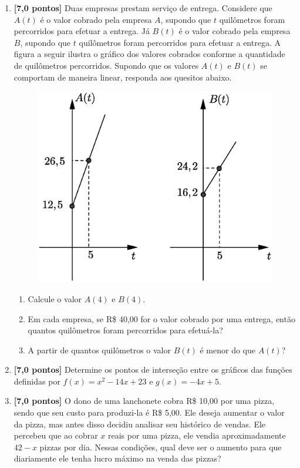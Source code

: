 \documentclass[12pt,a4paper]{article}
\begin{document}
\begin{enumerate}
  \item \textbf{[7,0 pontos]} Duas empresas prestam serviço de entrega. Considere que $A(t)$ é o valor
    cobrado pela empresa $A$, supondo que $t$ quilômetros foram percorridos para
    efetuar a entrega. Já $B(t)$ é o valor cobrado pela empresa $B$, supondo que
    $t$ quilômetros foram percorridos para efetuar a entrega. A figura a seguir
    ilustra o gráfico dos valores cobrados conforme a quantidade de quilômetros
    percorridos. Supondo que os valores $A(t)$ e $B(t)$ se comportam de maneira
    linear, responda aos quesitos abaixo.
  
  \begin{figure}[H]
    \centering
    \includegraphics[scale=0.5]{figura/grafico-duas-empresas.eps}
  \end{figure}
  
  \begin{enumerate}
    \item Calcule o valor $A(4)$ e $B(4)$.
    \item Em cada empresa, se R\$ 40,00 for o valor cobrado por uma entrega, então quantos quilômetros foram percorridos para efetuá-la?
    \item A partir de quantos quilômetros o valor $B(t)$ é menor do que $A(t)$?
  \end{enumerate}

  \item \textbf{[7,0 pontos]} Determine os pontos de interseção entre os gráficos das funções definidas por 
  $f(x) = x^2 - 14x + 23$ e $g(x) = -4x + 5$.
  
  \item \textbf{[7,0 pontos]} O dono de uma lanchonete cobra R\$ 10,00 por uma pizza, sendo que seu custo
    para produzi-la é R\$ 5,00. Ele deseja aumentar o valor da pizza, mas antes disso
    decidiu analisar seu histórico de vendas. Ele percebeu que ao cobrar $x$ reais
    por uma pizza, ele vendia aproximadamente $42 - x$ pizzas por dia. Nessas condições,
    qual deve ser o aumento para que diariamente ele tenha lucro máximo na
    venda das pizzas?
  
\end{enumerate}
\end{document}
